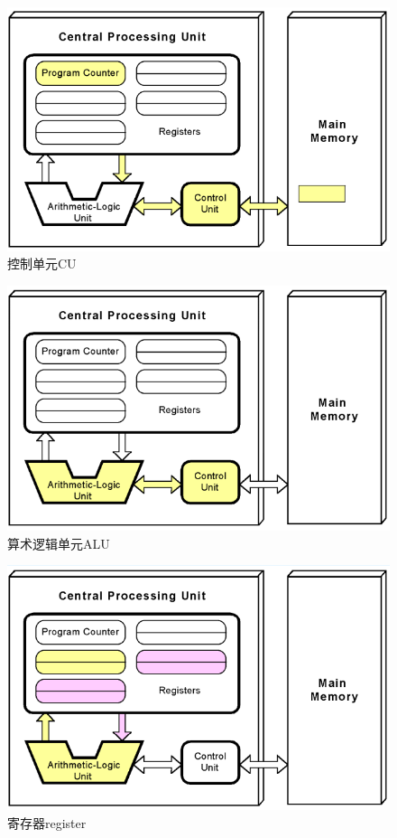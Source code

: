 \begin{figure}[H]
	\centering
	\includegraphics[scale=0.5]{img/C1/1-3/2.png}
	\caption{控制单元CU}
\end{figure}

\begin{figure}[H]
	\centering
	\includegraphics[scale=0.5]{img/C1/1-3/3.png}
	\caption{算术逻辑单元ALU}
\end{figure}

\begin{figure}[H]
	\centering
	\includegraphics[scale=0.5]{img/C1/1-3/4.png}
	\caption{寄存器register}
\end{figure}


